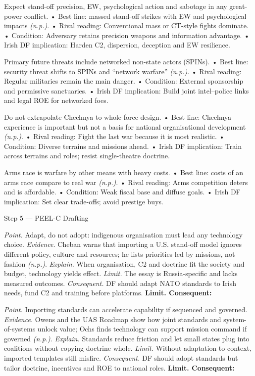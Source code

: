 Expect stand-off precision, EW, psychological action and sabotage in any great-power conflict.
• Best line: massed stand-off strikes with EW and psychological impacts \emph{(n.p.)}.
• Rival reading: Conventional mass or CT-style fights dominate.
• Condition: Adversary retains precision weapons and information advantage.
• Irish DF implication: Harden C2, dispersion, deception and EW resilience.

Primary future threats include networked non-state actors (SPINs).
• Best line: security threat shifts to SPINs and “network warfare” \emph{(n.p.)}.
• Rival reading: Regular militaries remain the main danger.
• Condition: External sponsorship and permissive sanctuaries.
• Irish DF implication: Build joint intel–police links and legal ROE for networked foes.

Do not extrapolate Chechnya to whole-force design.
• Best line: Chechnya experience is important but not a basis for national organisational development \emph{(n.p.)}.
• Rival reading: Fight the last war because it is most realistic.
• Condition: Diverse terrains and missions ahead.
• Irish DF implication: Train across terrains and roles; resist single-theatre doctrine.

Arms race is warfare by other means with heavy costs.
• Best line: costs of an arms race compare to real war \emph{(n.p.)}.
• Rival reading: Arms competition deters and is affordable.
• Condition: Weak fiscal base and diffuse goals.
• Irish DF implication: Set clear trade-offs; avoid prestige buys.

Step 5 — PEEL-C Drafting

\textit{Point.} Adapt, do not adopt: indigenous organisation must lead any technology choice.
\textit{Evidence.} Cheban warns that importing a U.S. stand-off model ignores different policy, culture and resources; he lists priorities led by missions, not fashion \emph{(n.p.)}.
\textit{Explain.} When organisation, C2 and doctrine fit the society and budget, technology yields effect.
\textit{Limit.} The essay is Russia-specific and lacks measured outcomes.
\textit{Consequent.} DF should adapt NATO standards to Irish needs, fund C2 and training before platforms. \textbf{Limit. Consequent:}

\textit{Point.} Importing standards can accelerate capability if sequenced and governed.
\textit{Evidence.} Owens and the UAS Roadmap show how joint standards and system-of-systems unlock value; Ochs finds technology can support mission command if governed \emph{(n.p.)}.
\textit{Explain.} Standards reduce friction and let small states plug into coalitions without copying doctrine whole.
\textit{Limit.} Without adaptation to context, imported templates still misfire.
\textit{Consequent.} DF should adopt standards but tailor doctrine, incentives and ROE to national roles. \textbf{Limit. Consequent:}


